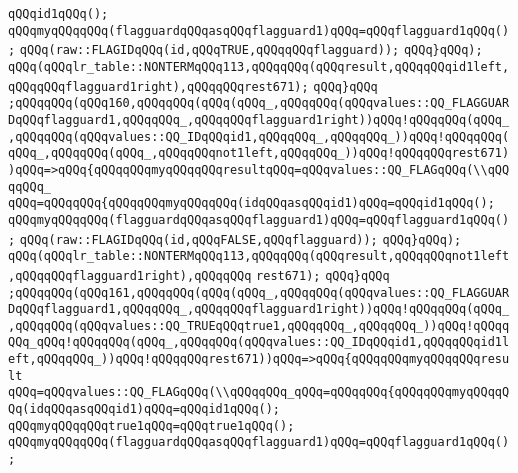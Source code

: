 \verb|qQQqid1qQQq();|\newline
\verb|qQQqmyqQQqqQQq(flagguardqQQqasqQQqflagguard1)qQQq=qQQqflagguard1qQQq();|\newline
\verb|qQQq(raw::FLAGIDqQQq(id,qQQqTRUE,qQQqqQQqflagguard));|\newline
\verb|qQQq}qQQq);|\newline
\verb|qQQq(qQQqlr_table::NONTERMqQQq113,qQQqqQQq(qQQqresult,qQQqqQQqid1left,qQQqqQQqflagguard1right),qQQqqQQqrest671);|\newline
\verb|qQQq}qQQq|\newline
\verb|;qQQqqQQq(qQQq160,qQQqqQQq(qQQq(qQQq_,qQQqqQQq(qQQqvalues::QQ_FLAGGUARDqQQqflagguard1,qQQqqQQq_,qQQqqQQqflagguard1right))qQQq!qQQqqQQq(qQQq_,qQQqqQQq(qQQqvalues::QQ_IDqQQqid1,qQQqqQQq_,qQQqqQQq_))qQQq!qQQqqQQq(qQQq_,qQQqqQQq(qQQq_,qQQqqQQqnot1left,qQQqqQQq_))qQQq!qQQqqQQqrest671))qQQq=>qQQq{qQQqqQQqmyqQQqqQQqresultqQQq=qQQqvalues::QQ_FLAGqQQq(\\qQQqqQQq_|\newline
\verb|qQQq=qQQqqQQq{qQQqqQQqmyqQQqqQQq(idqQQqasqQQqid1)qQQq=qQQqid1qQQq();|\newline
\verb|qQQqmyqQQqqQQq(flagguardqQQqasqQQqflagguard1)qQQq=qQQqflagguard1qQQq();|\newline
\verb|qQQq(raw::FLAGIDqQQq(id,qQQqFALSE,qQQqflagguard));|\newline
\verb|qQQq}qQQq);|\newline
\verb|qQQq(qQQqlr_table::NONTERMqQQq113,qQQqqQQq(qQQqresult,qQQqqQQqnot1left,qQQqqQQqflagguard1right),qQQqqQQq|\newline
\verb|rest671);|\newline
\verb|qQQq}qQQq|\newline
\verb|;qQQqqQQq(qQQq161,qQQqqQQq(qQQq(qQQq_,qQQqqQQq(qQQqvalues::QQ_FLAGGUARDqQQqflagguard1,qQQqqQQq_,qQQqqQQqflagguard1right))qQQq!qQQqqQQq(qQQq_,qQQqqQQq(qQQqvalues::QQ_TRUEqQQqtrue1,qQQqqQQq_,qQQqqQQq_))qQQq!qQQqqQQq_qQQq!qQQqqQQq(qQQq_,qQQqqQQq(qQQqvalues::QQ_IDqQQqid1,qQQqqQQqid1left,qQQqqQQq_))qQQq!qQQqqQQqrest671))qQQq=>qQQq{qQQqqQQqmyqQQqqQQqresult|\newline
\verb|qQQq=qQQqvalues::QQ_FLAGqQQq(\\qQQqqQQq_qQQq=qQQqqQQq{qQQqqQQqmyqQQqqQQq(idqQQqasqQQqid1)qQQq=qQQqid1qQQq();|\newline
\verb|qQQqmyqQQqqQQqtrue1qQQq=qQQqtrue1qQQq();|\newline
\verb|qQQqmyqQQqqQQq(flagguardqQQqasqQQqflagguard1)qQQq=qQQqflagguard1qQQq();|\newline
